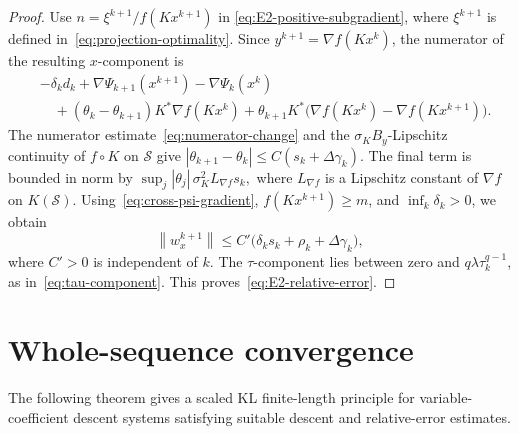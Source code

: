 \documentclass[9pt]{article}
\numberwithin{equation}{section}
\theoremstyle{definition}
\theoremstyle{remark}
\newcommand{\Sset}{\mathcal S}
\newcommand{\norm}[1]{\left\lVert #1\right\rVert}
\newcommand{\abs}[1]{\left\lvert #1\right\rvert}
\begin{document}
\begin{proof}
Use $n=\xi^{k+1}/f(Kx^{k+1})$ in
\eqref{eq:E2-positive-subgradient}, where $\xi^{k+1}$ is defined
in~\eqref{eq:projection-optimality}. Since
$y^{k+1}=\nabla f(Kx^k)$, the numerator of the resulting
$x$-component is
\[
\begin{aligned}
 &-\delta_kd_k+\nabla\Psi_{k+1}(x^{k+1})-\nabla\Psi_k(x^k)\\
 &\quad+(\theta_k-\theta_{k+1})K^*\nabla f(Kx^k)
 +\theta_{k+1}K^*
   \bigl(\nabla f(Kx^k)-\nabla f(Kx^{k+1})\bigr).
\end{aligned}
\]
The numerator estimate~\eqref{eq:numerator-change} and the
$\sigma_K B_y$-Lipschitz continuity of $f\circ K$ on $\Sset$ give
$\abs{\theta_{k+1}-\theta_k}\leq C(s_k+\Delta\gamma_k)$.
The final term is bounded in norm by
$
 \sup_j\abs{\theta_j}\,\sigma_K^2L_{\nabla f}s_k,
$
where $L_{\nabla f}$ is a Lipschitz constant of $\nabla f$ on
$K(\Sset)$. Using~\eqref{eq:cross-psi-gradient},
$f(Kx^{k+1})\geq m$, and $\inf_k\delta_k>0$, we obtain
\[
 \norm{w_x^{k+1}}
 \leq C'\bigl(\delta_ks_k+\rho_k+\Delta\gamma_k\bigr),
\]
where $C'>0$ is independent of $k$.
The $\tau$-component lies between zero and
$q\lambda\tau_k^{q-1}$, as in~\eqref{eq:tau-component}.
This proves~\eqref{eq:E2-relative-error}.
\end{proof}

\section{Whole-sequence convergence}\label{sec:main}
The following theorem gives a scaled KL finite-length principle for
variable-coefficient descent systems satisfying suitable descent and
relative-error estimates.
\end{document}
